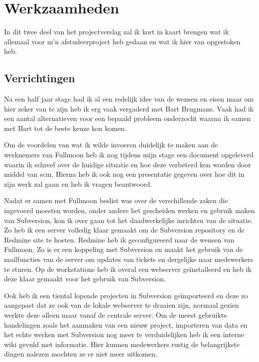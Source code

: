 \chapter{Werkzaamheden}

In dit twee deel van het projectverslag zal ik kort in kaart brengen wat ik allemaal voor m'n afstudeerproject heb gedaan en wat ik hier van opgestoken heb.

\section{Verrichtingen}

Na een half jaar stage had ik al een redelijk idee van de wensen en eisen maar om hier zeker van te zijn heb ik erg vaak vergaderd met Bart Brugmans. Vaak had ik een aantal alternatieven voor een bepaald probleem onderzocht waarna ik samen met Bart tot de beste keuze kon komen.

Om de voordelen van wat ik wilde invoeren duidelijk te maken aan de werknemers van Fullmoon heb ik nog tijdens mijn stage een document opgeleverd waarin ik schreef over de huidige situatie en hoe deze verbeterd kon worden door middel van {\sc scm}. Hierna heb ik ook nog een presentatie gegeven over hoe dit in zijn werk zal gaan en heb ik vragen beantwoord.

Nadat er samen met Fullmoon beslist was over de verschillende zaken die ingevoerd moesten worden, onder andere het gescheiden werken en gebruik maken van Subversion, kon ik over gaan tot het daadwerkelijke inrichten van de situatie. Zo heb ik een server volledig klaar gemaakt om de Subversion repository en de Redmine site te hosten. Redmine heb ik geconfigureerd naar de wensen van Fullmoon. Zo is er een koppeling met Subversion en maakt het gebruik van de mailfuncties van de server om updates van tickets en dergelijke naar medewerkers te sturen. Op de workstations heb ik overal een webserver geïnstalleerd en heb ik deze klaar gemaakt voor het gebruik van Subversion.

Ook heb ik een tiental lopende projecten in Subversion geïmporteerd en deze zo aangepast dat ze ook van de lokale webserver te draaien zijn, normaal gezien werkte deze alleen maar vanaf de centrale server. Om de meest gebruikte handelingen zoals het aanmaken van een nieuw project, importeren van data en het echte werken met Subversion nog meer te verduidelijken heb ik een interne wiki gevuld met informatie. Hier kunnen medewerkers rustig de belangrijkste dingen nalezen mochten ze er niet meer uitkomen.

